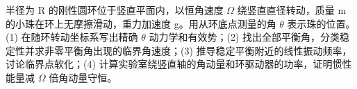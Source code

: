 半径为 R 的刚性圆环位于竖直平面内，以恒角速度 \(\Omega \) 绕竖直直径转动，质量 m 的小珠在环上无摩擦滑动，重力加速度 g。用从环底点测量的角 \(\theta \) 表示珠的位置。
(1) 在随环转动坐标系写出精确 \(\theta \) 动力学和有效势；(2) 找出全部平衡角，分类稳定性并求非零平衡角出现的临界角速度；(3) 推导稳定平衡附近的线性振动频率，讨论临界点软化；(4) 计算实验室绕竖直轴的角动量和环驱动器的功率，证明惯性能量减 \(\Omega \) 倍角动量守恒。
